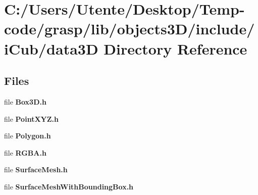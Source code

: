 \section{C\+:/\+Users/\+Utente/\+Desktop/\+Temp-\/code/grasp/lib/objects3\+D/include/i\+Cub/data3\+D Directory Reference}
\label{dir_b078b37f4859b4fdba58d30fdeed57d2}
\subsection*{Files}
\begin{DoxyCompactItemize}
\item 
file {\bfseries Box3\+D.\+h}
\item 
file {\bfseries Point\+X\+Y\+Z.\+h}
\item 
file {\bfseries Polygon.\+h}
\item 
file {\bfseries R\+G\+B\+A.\+h}
\item 
file {\bfseries Surface\+Mesh.\+h}
\item 
file {\bfseries Surface\+Mesh\+With\+Bounding\+Box.\+h}
\end{DoxyCompactItemize}
